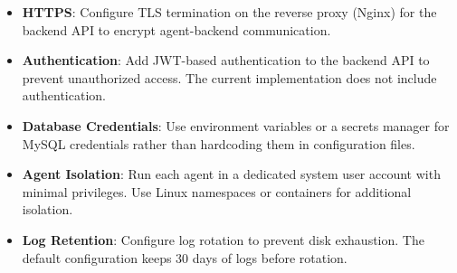 \documentclass[../Main.tex]{subfiles}
\begin{document}
\begin{itemize}
    \item \textbf{HTTPS}: Configure TLS termination on the reverse proxy (Nginx) for the backend API to encrypt agent-backend communication.
    \item \textbf{Authentication}: Add JWT-based authentication to the backend API to prevent unauthorized access. The current implementation does not include authentication.
    \item \textbf{Database Credentials}: Use environment variables or a secrets manager for MySQL credentials rather than hardcoding them in configuration files.
    \item \textbf{Agent Isolation}: Run each agent in a dedicated system user account with minimal privileges. Use Linux namespaces or containers for additional isolation.
    \item \textbf{Log Retention}: Configure log rotation to prevent disk exhaustion. The default configuration keeps 30 days of logs before rotation.
\end{itemize}
\end{document}
